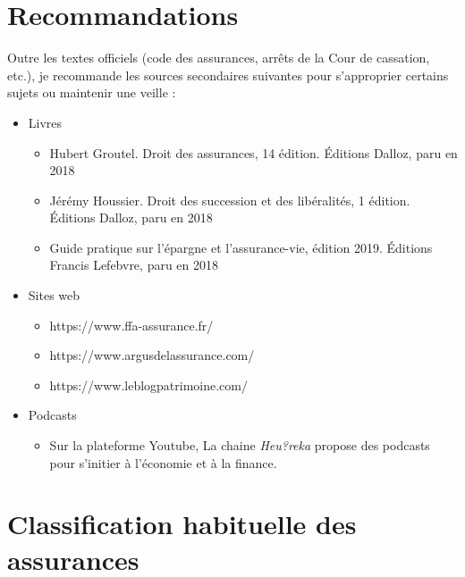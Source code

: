\documentclass{article}
\begin{document}
\newpage
\section{Recommandations}
Outre les textes officiels (code des assurances, arrêts de la Cour de cassation, etc.), je recommande les sources secondaires suivantes pour s'approprier certains sujets ou maintenir une veille :
\begin{itemize}
    \item Livres
        \begin{itemize}
        \item Hubert Groutel. Droit des assurances, 14 édition. Éditions Dalloz, paru en 2018
        \item Jérémy Houssier. Droit des succession et des libéralités, 1 édition. Éditions Dalloz, paru en 2018
        \item Guide pratique sur l'épargne et l'assurance-vie, édition 2019. Éditions Francis Lefebvre, paru en 2018
    \end{itemize}
    \item Sites web
    \begin{itemize}
        \item https://www.ffa-assurance.fr/
        \item https://www.argusdelassurance.com/
        \item https://www.leblogpatrimoine.com/
    \end{itemize}
    \item Podcasts
    \begin{itemize}
        \item Sur la plateforme Youtube, La chaine \textit{Heu?reka} propose des podcasts pour s'initier à l'économie et à la finance.
    \end{itemize}
\end{itemize}


\afterpage{\null\newpage}

\appendix

\section{Classification habituelle des assurances}
\label{appendix:classification-assurances}
\end{document}

